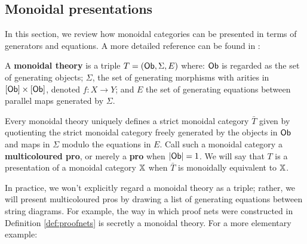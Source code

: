 \subsection{Monoidal presentations}
In this section, we review how monoidal categories can be presented in terms of generators and equations. A more detailed reference can be found in \cite{ih}:





\begin{definition}
\label{def:monoidaltheory}


A {\bf monoidal theory} is a triple $T=({\sf Ob},\Sigma ,E )$ where: ${\sf Ob}$ is regarded as the set of generating objects; $\Sigma$, the set of generating morphisms with arities in $[{\sf Ob}]\times [{\sf Ob}]$, denoted $f:X\to Y$;  and $E$ the set of generating equations between parallel maps generated by $\Sigma$.

Every monoidal theory uniquely defines a strict monoidal category $\bar T$ given by quotienting the strict monoidal category freely generated by the objects in $\sf Ob$ and maps in $\Sigma$ modulo the equations in $E$.  Call such a monoidal category a {\bf multicoloured pro}, or merely a {\bf pro} when $|{\sf Ob}|=1$.  We will say that $T$ is a presentation of a monoidal category $\mathbb{X}$ when $\bar T$ is monoidally equivalent to $\mathbb{X}$.
\end{definition}



 In practice, we won't explicitly regard a  monoidal theory as a triple; rather, we will present multicoloured pros by drawing a list of generating equations between string diagrams.
For example, the way in which proof nets were constructed in Definition \ref{def:proofnets} is secretly a monoidal theory.
For a more elementary example:

